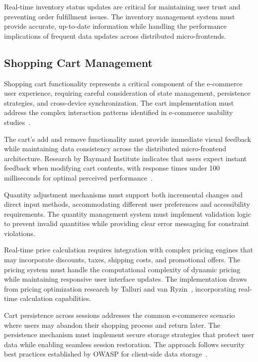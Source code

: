 \documentclass[12pt,a4paper]{report}
\begin{document}
Real-time inventory status updates are critical for maintaining user trust and preventing order fulfillment issues. The inventory management system must provide accurate, up-to-date information while handling the performance implications of frequent data updates across distributed micro-frontends.

\subsection{Shopping Cart Management}

Shopping cart functionality represents a critical component of the e-commerce user experience, requiring careful consideration of state management, persistence strategies, and cross-device synchronization. The cart implementation must address the complex interaction patterns identified in e-commerce usability studies~\cite{baymard2019cart}.

The cart's add and remove functionality must provide immediate visual feedback while maintaining data consistency across the distributed micro-frontend architecture. Research by Baymard Institute indicates that users expect instant feedback when modifying cart contents, with response times under 100 milliseconds for optimal perceived performance~\cite{baymard2019cart}.

Quantity adjustment mechanisms must support both incremental changes and direct input methods, accommodating different user preferences and accessibility requirements. The quantity management system must implement validation logic to prevent invalid quantities while providing clear error messaging for constraint violations.

Real-time price calculation requires integration with complex pricing engines that may incorporate discounts, taxes, shipping costs, and promotional offers. The pricing system must handle the computational complexity of dynamic pricing while maintaining responsive user interface updates. The implementation draws from pricing optimization research by Talluri and van Ryzin~\cite{talluri2004revenue}, incorporating real-time calculation capabilities.

Cart persistence across sessions addresses the common e-commerce scenario where users may abandon their shopping process and return later. The persistence mechanism must implement secure storage strategies that protect user data while enabling seamless session restoration. The approach follows security best practices established by OWASP for client-side data storage~\cite{owasp2021storage}.
\end{document}
